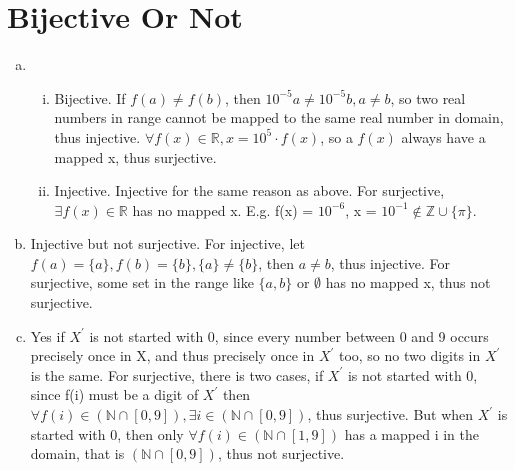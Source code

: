 \documentclass{article}
\begin{document}
    \part*{Bijective Or Not}
    \begin{enumerate}[(a).]
        \item \begin{enumerate}[(i).]
            \item Bijective. If $f(a) \neq f(b)$, then $10^{-5}a \neq 10^{-5}b, a \neq b$, 
            so two real numbers in range cannot be mapped to the same real number in domain, thus injective.
            $\forall f(x) \in \mathbb{R}, x = 10^{5} \cdot f(x)$, so a $f(x)$ always have a mapped x, thus surjective.
            
            \item Injective. Injective for the same reason as above. For surjective, 
            $\exists f(x) \in \mathbb{R}$ has no mapped x. E.g. f(x) = $10^{-6}$, x = $10^{-1} \notin \mathbb{Z} \cup \{\pi\}$.
        \end{enumerate}

        \item Injective but not surjective. For injective, let $f(a) = \{a\}, f(b) = \{b\}, 
        \{a\} \neq \{b\}$, then $a \neq b$, thus injective. For surjective, some set in the range like 
        $\{a, b\}$ or $\emptyset$ has no mapped x, thus not surjective.

        \item Yes if $X^{'}$ is not started with 0, since every number between 0 and 9 occurs 
        precisely once in X, and thus precisely once in $X^{'}$ too, so no two digits in $X^{'}$ is the same. 
        For surjective, there is two cases, if $X^{'}$ is not started with 0, since f(i) must be a digit of $X^{'}$ 
        then $\forall f(i) \in (\mathbb{N} \cap [0,9]), \exists i \in (\mathbb{N} \cap [0,9])$, thus surjective. 
        But when $X^{'}$ is started with 0, then only $\forall f(i) \in (\mathbb{N} \cap [1,9])$ has a mapped i in the domain, 
        that is $(\mathbb{N} \cap [0,9])$, thus not surjective.
    \end{enumerate}
\end{document}

